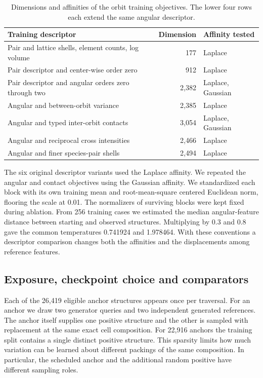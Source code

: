 \begin{table}[tbp]\centering\small
\caption{Dimensions and affinities of the orbit training objectives. The lower four rows each extend the same angular descriptor.}
\label{tab:generator-kernel-dimensions}
\begin{tabular}{lrl}\hline
Training descriptor & Dimension & Affinity tested\\\hline
Pair and lattice shells, element counts, log volume & 177 & Laplace\\
Pair descriptor and center-wise order zero & 912 & Laplace\\
Pair descriptor and angular orders zero through two & 2,382 & Laplace, Gaussian\\
Angular and between-orbit variance & 2,385 & Laplace\\
Angular and typed inter-orbit contacts & 3,054 & Laplace, Gaussian\\
Angular and reciprocal cross intensities & 2,466 & Laplace\\
Angular and finer species-pair shells & 2,494 & Laplace\\\hline
\end{tabular}
\end{table}

The six original descriptor variants used the Laplace affinity. We repeated the angular and contact objectives using the Gaussian affinity. We standardized each block with its own training mean and root-mean-square centered Euclidean norm, flooring the scale at 0.01. The normalizers of surviving blocks were kept fixed during ablation. From 256 training cases we estimated the median angular-feature distance between starting and observed structures. Multiplying by 0.3 and 0.8 gave the common temperatures 0.741924 and 1.978464. With these conventions a descriptor comparison changes both the affinities and the displacements among reference features.

\subsection{Exposure, checkpoint choice and comparators}

Each of the 26,419 eligible anchor structures appears once per traversal. For an anchor we draw two generator queries and two independent generated references. The anchor itself supplies one positive structure and the other is sampled with replacement at the same exact cell composition. For 22,916 anchors the training split contains a single distinct positive structure. This sparsity limits how much variation can be learned about different packings of the same composition. In particular, the scheduled anchor and the additional random positive have different sampling roles.

